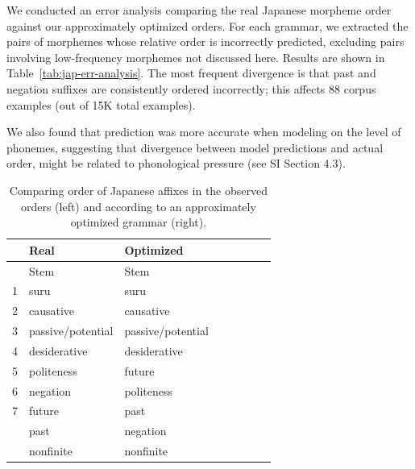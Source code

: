 We conducted an error analysis comparing the real Japanese morpheme order against our approximately optimized orders.
For each grammar, we extracted the pairs of morphemes whose relative order is incorrectly predicted, excluding pairs involving low-frequency morphemes not discussed here. 
Results are shown in Table~\ref{tab:jap-err-analysis}.
The most frequent divergence is that past and negation suffixes are consistently ordered incorrectly; this affects 88 corpus examples (out of 15K total examples).

We also found that prediction was more accurate when modeling on the level of phonemes, suggesting that divergence between model predictions and actual order, might be related to phonological pressure (see SI Section 4.3).

\begin{table}
    \centering
    \begin{tabular}{llllllll}
	    &	    Real & Optimized \\ \hline\hline
	    &    Stem & Stem \\ \hline
1 & suru & suru \\
2 & causative & causative \\
3 & passive/potential & passive/potential \\
4 & desiderative & desiderative \\
5 & politeness & future \\
6 & negation & politeness \\
7 & future & past \\
 & past & negation \\
 & nonfinite & nonfinite \\ 
 \hline
    \end{tabular}
    \caption{Comparing order of Japanese affixes in the observed orders (left) and according to an approximately optimized grammar (right).}
    \label{tab:grammar-table-jap}
\end{table}

